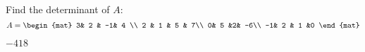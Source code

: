
\begin{Exercise}[
name={},
title={}, 
difficulty=0,
origin={\cite{AG}}]
Find the determinant of $A$:
$$
A= \begin{mat}
3& 2 & -1& 4 \\
2 & 1 & 5 & 7\\
0& 5 &2& -6\\
-1& 2 & 1 &0
\end{mat}
$$

\end{Exercise}
\begin{Answer}
$-418$
\end{Answer}
